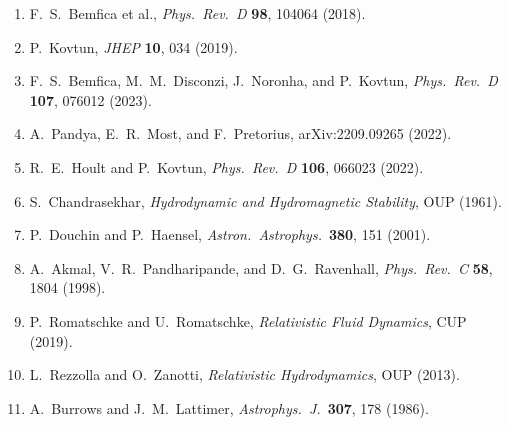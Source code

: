 \begin{enumerate}
\item F.~S.~Bemfica et al., \textit{Phys.\ Rev.\ D} \textbf{98}, 104064 (2018).
\item P.~Kovtun, \textit{JHEP} \textbf{10}, 034 (2019).
\item F.~S.~Bemfica, M.~M.~Disconzi, J.~Noronha, and P.~Kovtun,
  \textit{Phys.\ Rev.\ D} \textbf{107}, 076012 (2023).
\item A.~Pandya, E.~R.~Most, and F.~Pretorius, arXiv:2209.09265 (2022).
\item R.~E.~Hoult and P.~Kovtun, \textit{Phys.\ Rev.\ D} \textbf{106}, 066023 (2022).
\item S.~Chandrasekhar, \textit{Hydrodynamic and Hydromagnetic Stability}, OUP (1961).
\item P.~Douchin and P.~Haensel, \textit{Astron.\ Astrophys.}\ \textbf{380}, 151 (2001).
\item A.~Akmal, V.~R.~Pandharipande, and D.~G.~Ravenhall, \textit{Phys.\ Rev.\ C} \textbf{58}, 1804 (1998).
\item P.~Romatschke and U.~Romatschke, \textit{Relativistic Fluid Dynamics}, CUP (2019).
\item L.~Rezzolla and O.~Zanotti, \textit{Relativistic Hydrodynamics}, OUP (2013).
\item A.~Burrows and J.~M.~Lattimer, \textit{Astrophys.\ J.}\ \textbf{307}, 178 (1986).
\end{enumerate}

